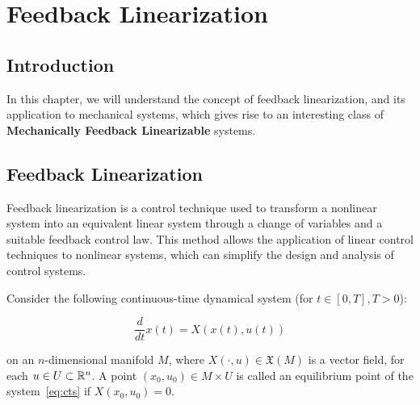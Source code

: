 \chapter{Feedback Linearization}

\section{Introduction}

In this chapter, we will understand the concept of feedback linearization, and its application to mechanical systems, which gives rise to an interesting class of \textbf{Mechanically Feedback Linearizable} systems.

\section{Feedback Linearization}

Feedback linearization is a control technique used to transform a nonlinear system into an equivalent linear system through a change of variables and a suitable feedback control law. This method allows the application of linear control techniques to nonlinear systems, which can simplify the design and analysis of control systems.

Consider the following continuous-time dynamical system (for $t \in [0, T ], T > 0$):

\begin{equation}
    \label{eq:cts}
    \dfrac{d}{dt}x(t) = X(x(t), u(t))
\end{equation}

on an $n$-dimensional manifold $M$, where $X(\cdot, u) \in \mathfrak{X}(M)$ is a vector field, for each $u \in U \subset \R[n]$. A point $(x_0, u_0) \in M \times U$ is called an equilibrium point of the system~\eqref{eq:cts} if $X(x_0, u_0) = 0$.

